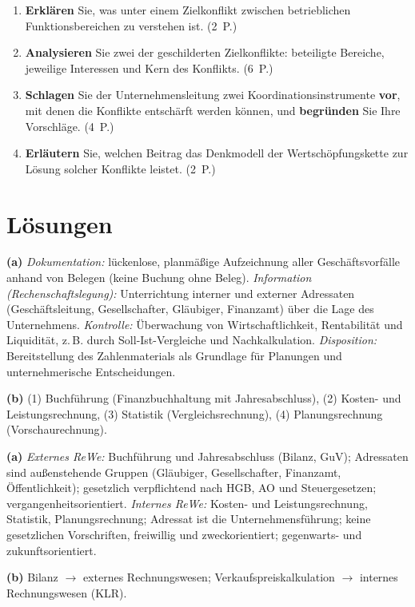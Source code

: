 \documentclass[11pt, a4paper]{article}
\begin{document}
\begin{enumerate}[label=(\alph*)]
  \item \textbf{Erklären} Sie, was unter einem Zielkonflikt zwischen betrieblichen
    Funktionsbereichen zu verstehen ist. \hfill (2~P.)
  \item \textbf{Analysieren} Sie zwei der geschilderten Zielkonflikte: beteiligte
    Bereiche, jeweilige Interessen und Kern des Konflikts. \hfill (6~P.)
  \item \textbf{Schlagen} Sie der Unternehmensleitung zwei Koordinationsinstrumente
    \textbf{vor}, mit denen die Konflikte entschärft werden können, und \textbf{begründen}
    Sie Ihre Vorschläge. \hfill (4~P.)
  \item \textbf{Erläutern} Sie, welchen Beitrag das Denkmodell der Wertschöpfungskette
    zur Lösung solcher Konflikte leistet. \hfill (2~P.)
\end{enumerate}

\newpage
\section{Lösungen}\label{loesungen}

\begin{loesung}[title={Lösung Aufgabe~1 --- Aufgaben und Teilgebiete des Rechnungswesens}]
\textbf{(a)} \emph{Dokumentation:} lückenlose, planmäßige Aufzeichnung aller
Geschäftsvorfälle anhand von Belegen (keine Buchung ohne Beleg).
\emph{Information (Rechenschaftslegung):} Unterrichtung interner und externer Adressaten
(Geschäftsleitung, Gesellschafter, Gläubiger, Finanzamt) über die Lage des Unternehmens.
\emph{Kontrolle:} Überwachung von Wirtschaftlichkeit, Rentabilität und Liquidität, z.\,B.
durch Soll-Ist-Vergleiche und Nachkalkulation.
\emph{Disposition:} Bereitstellung des Zahlenmaterials als Grundlage für Planungen und
unternehmerische Entscheidungen.

\textbf{(b)} (1) Buchführung (Finanzbuchhaltung mit Jahresabschluss),
(2) Kosten- und Leistungsrechnung, (3) Statistik (Vergleichsrechnung),
(4) Planungsrechnung (Vorschaurechnung).
\end{loesung}

\begin{loesung}[title={Lösung Aufgabe~2 --- Internes vs. externes Rechnungswesen}]
\textbf{(a)} \emph{Externes ReWe:} Buchführung und Jahresabschluss (Bilanz, GuV);
Adressaten sind außenstehende Gruppen (Gläubiger, Gesellschafter, Finanzamt,
Öffentlichkeit); gesetzlich verpflichtend nach HGB, AO und Steuergesetzen;
vergangenheitsorientiert. \emph{Internes ReWe:} Kosten- und Leistungsrechnung, Statistik,
Planungsrechnung; Adressat ist die Unternehmensführung; keine gesetzlichen Vorschriften,
freiwillig und zweckorientiert; gegenwarts- und zukunftsorientiert.

\textbf{(b)} Bilanz $\rightarrow$ externes Rechnungswesen; Verkaufspreiskalkulation
$\rightarrow$ internes Rechnungswesen (KLR).
\end{loesung}
\end{document}
